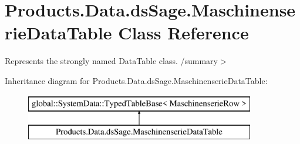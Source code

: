 \hypertarget{class_products_1_1_data_1_1ds_sage_1_1_maschinenserie_data_table}{}\section{Products.\+Data.\+ds\+Sage.\+Maschinenserie\+Data\+Table Class Reference}
\label{class_products_1_1_data_1_1ds_sage_1_1_maschinenserie_data_table}


Represents the strongly named Data\+Table class. /summary$>$  


Inheritance diagram for Products.\+Data.\+ds\+Sage.\+Maschinenserie\+Data\+Table\+:\begin{figure}[H]
\begin{center}
\leavevmode
\includegraphics[height=2.000000cm]{class_products_1_1_data_1_1ds_sage_1_1_maschinenserie_data_table}
\end{center}
\end{figure}
